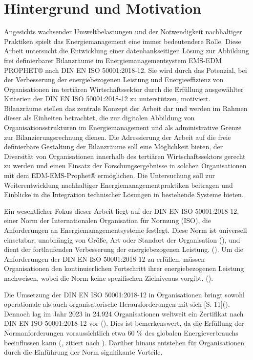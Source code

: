 \section{Hintergrund und Motivation}
Angesichts wachsender Umweltbelastungen und der Notwendigkeit nachhaltiger Praktiken spielt das Energiemanagement eine immer bedeutendere Rolle.
Diese Arbeit untersucht die Entwicklung einer datenbankseitigen Lösung zur Abbildung frei definierbarer Bilanzräume im Energiemanagementsystem
EMS-EDM PROPHET® nach DIN EN ISO 50001:2018-12.
Sie wird durch das Potenzial, bei der Verbesserung der energiebezogenen Leistung und Energieeffizienz von Organisationen im tertiären Wirtschaftssektor 
durch die Erfüllung ausgewählter Kriterien der DIN EN ISO 50001:2018-12 zu unterstützen, motiviert. 
Bilanzräume stellen das zentrale Konzept der Arbeit dar und werden im Rahmen dieser als Einheiten betrachtet, die zur digitalen Abbildung 
von Organisationsstrukturen im Energiemanagement und als administrative Grenze zur Bilanzierungsrechnung dienen.
Die Adressierung der Arbeit auf die freie definierbare Gestaltung der Bilanzräume soll eine Möglichkeit bieten, der Diversität von Organisationen innerhalb des 
tertiären Wirtschaftssektors gerecht zu werden
und einen Einsatz der Forschungsergebnisse in solchen Organisationen mit dem EDM-EMS-Prophet® ermöglichen.
Die Untersuchung soll zur Weiterentwicklung nachhaltiger Energiemanagementpraktiken beitragen und Einblicke in die Integration
technischer Lösungen in bestehende Systeme bieten.

Ein wesentlicher Fokus dieser Arbeit liegt auf der DIN EN ISO 50001:2018-12, einer Norm der Internationalen Organisation für Normung (ISO),
die Anforderungen an Energiemanagementsysteme festlegt. Diese Norm ist universell einsetzbar, unabhängig von Größe, Art oder Standort der Organisation (\cite[S. 10]{DIN50001.2018}),
und dient der fortlaufenden Verbesserung der energiebezogenen Leistung. (\cite[S. 7]{DIN50001.2018}).
Um die Anforderungen der DIN EN ISO 50001:2018-12 zu erfüllen, müssen Organisationen den kontinuierlichen Fortschritt ihrer energiebezogenen Leistung nachweisen, wobei
die Norm keine spezifischen Zielniveaus vorgibt. (\cite[S. 10]{DIN50001.2018}).

Die Umsetzung der DIN EN ISO 50001:2018-12 in Organisationen bringt sowohl operationale als auch organisatorische Herausforderungen mit sich [S. 11](\cite{Marimon.2017}).
Dennoch lag im Jahr 2023 in 24.924 Organisationen weltweit ein Zertifikat nach DIN EN ISO 50001:2018-12 vor (\cite{InternationalOrganizationforStandardization.2023}).
Dies ist bemerkenswert, da die Erfüllung der Normanforderungen voraussichtlich etwa 60 \% des globalen Energieverbrauchs beeinflussen
kann (\cite{InternationalOrganizationforStandardization.2011}, zitiert nach \cite[S. 1]{Marimon.2017}). Darüber hinaus entstehen für Organisationen durch
die Einführung der Norm signifikante Vorteile.

